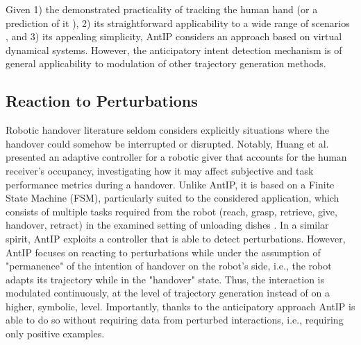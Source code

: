 \documentclass[lettersize,journal]{IEEEtran}
\begin{document}
Given 1) the demonstrated practicality of tracking the human hand \cite{prada_implementation_2014} (or a prediction of it \cite{medina_human-inspired_2016}), 2) its straightforward applicability to a wide range of scenarios \cite{prada_implementation_2014}, and 3) its appealing simplicity, AntIP considers an approach based on virtual dynamical systems.
However, the anticipatory intent detection mechanism is of general applicability to modulation of other trajectory generation methods.

\subsection{Reaction to Perturbations}
\label{subsec:rw:reaction}

\noindent
Robotic handover literature seldom considers explicitly situations where the handover could somehow be interrupted or disrupted.
Notably, Huang et al. \cite{huang_adaptive_2015} presented an adaptive controller for a robotic giver that accounts for the human receiver’s occupancy, investigating how it may affect subjective and task performance metrics during a handover.
Unlike AntIP, it is based on a Finite State Machine (FSM), particularly suited to the considered application, which consists of multiple tasks required from the robot (reach, grasp, retrieve, give, handover, retract) in the examined setting of unloading dishes \cite{huang_adaptive_2015}.
In a similar spirit, AntIP exploits a controller that is able to detect perturbations.
However, AntIP focuses on reacting to perturbations while under the assumption of "permanence" of the intention of handover on the robot’s side, i.e., the robot adapts its trajectory while in the "handover" state.
Thus, the interaction is modulated continuously, at the level of trajectory generation instead of on a higher, symbolic, level.
Importantly, thanks to the anticipatory approach AntIP is able to do so without requiring data from perturbed interactions, i.e., requiring only positive examples.

\end{document}
